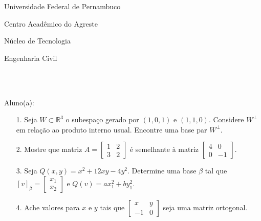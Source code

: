 \documentclass[oneside,a4paper,12pt]{article}
\newcommand{\universidade}{Universidade Federal de Pernambuco}
\newcommand{\centro}{Centro Acadêmico do Agreste}
\newcommand{\departamento}{Núcleo de Tecnologia}
\newcommand{\curso}{Engenharia Civil}
\begin{document}
	\pagestyle{empty}
	
	\begin{center}
	\vspace{0pt}
	
	\universidade
	\par
	\centro
	\par
	\departamento
	\par
	\curso
	\par
	\vspace{08pt}
		\\
		 \\
	\end{center}
	
	
	\begin{flushleft}
		Aluno(a):
	\end{flushleft}
	
\begin{itemize}
\item[1.] Seja $W\subset \mathbb{R}^{3}$ o subespaço gerado por $(1,0,1)$ e $(1,1,0)$. Considere $W^{\perp}$ em relação ao produto interno usual. Encontre uma base par $W^{\perp}$.
\end{itemize}
\begin{itemize}
\item[2.] Mostre que matriz $A=\begin{bmatrix}
1 & 2 \\
3 &2
\end{bmatrix}$ é semelhante à matriz $\begin{bmatrix}
4 & 0 \\
0 & -1
\end{bmatrix}$.
 \end{itemize}
 \begin{itemize}
\item [3.] Seja $Q(x,y)=x^{2}+12xy-4y^{2}$. Determine uma base $\beta$ tal que $[v]_{\beta}=\begin{bmatrix}
x_{1} \\
x_{2}
\end{bmatrix}$ e $Q(v)=ax_{1}^{2}+by_{1}^{2}$.
\end{itemize}
\begin{itemize}
\item[4.]Ache valores para $x$ e $y$ tais que $\left[\begin{array}{rr}
x&y\\
-1&0
\end{array}\right]$ seja uma matriz ortogonal.
\end{itemize}
\end{document}

